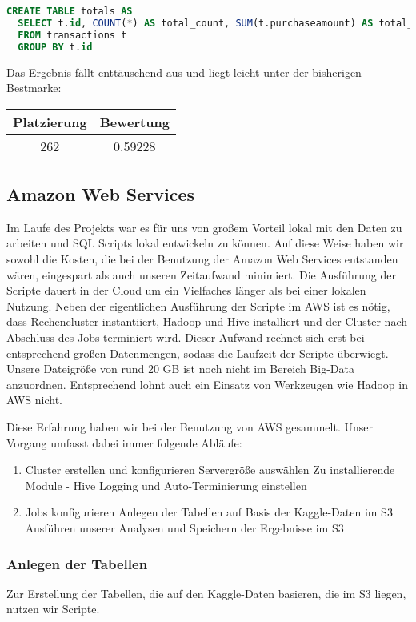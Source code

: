 \begin{lstlisting}[language=SQL]
CREATE TABLE totals AS
  SELECT t.id, COUNT(*) AS total_count, SUM(t.purchaseamount) AS total_spent
  FROM transactions t
  GROUP BY t.id
\end{lstlisting}

Das Ergebnis fällt enttäuschend aus und liegt leicht unter der bisherigen Bestmarke:
\begin{tabular}{|c|c|}
	\hline \textbf{Platzierung} & \textbf{Bewertung} \\ 
	\hline 262 & 0.59228  \\ 
	\hline 
\end{tabular}
	
\subsection{Amazon Web Services}
Im Laufe des Projekts war es für uns von großem Vorteil lokal mit den Daten zu arbeiten und SQL Scripts lokal entwickeln zu können. Auf diese Weise haben wir sowohl die Kosten, die bei der Benutzung der Amazon Web Services entstanden wären, eingespart als auch unseren Zeitaufwand minimiert. Die Ausführung der Scripte dauert in der Cloud um ein Vielfaches länger als bei einer lokalen Nutzung. Neben der eigentlichen Ausführung der Scripte im AWS ist es nötig, dass Rechencluster instantiiert, Hadoop und Hive installiert und der Cluster nach Abschluss des Jobs terminiert wird. Dieser Aufwand rechnet sich erst bei entsprechend großen Datenmengen, sodass die Laufzeit der Scripte überwiegt. Unsere Dateigröße von rund 20 GB ist noch nicht im Bereich Big-Data anzuordnen. Entsprechend lohnt auch ein Einsatz von Werkzeugen wie Hadoop in AWS nicht.

Diese Erfahrung haben wir bei der Benutzung von AWS gesammelt. Unser Vorgang umfasst dabei immer folgende Abläufe:
\begin{enumerate}
\item Cluster erstellen und konfigurieren
\subitem Servergröße auswählen
\subitem Zu installierende Module - Hive
\subitem Logging und Auto-Terminierung einstellen
\item Jobs konfigurieren
\subitem Anlegen der Tabellen auf Basis der Kaggle-Daten im S3
\subitem Ausführen unserer Analysen und Speichern der Ergebnisse im S3
\end{enumerate}

\subsubsection{Anlegen der Tabellen}
Zur Erstellung der Tabellen, die auf den Kaggle-Daten basieren, die im S3 liegen, nutzen wir Scripte. 

